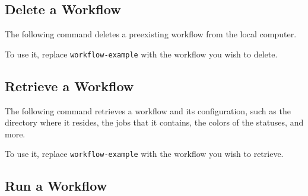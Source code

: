 \hypertarget{delete-a-workflow}{%
\subsection{Delete a Workflow}\label{delete-a-workflow}}

The following command deletes a preexisting workflow from the local
computer.

To use it, replace \texttt{workflow-example} with the workflow you wish
to delete.

\begin{Shaded}
\begin{Highlighting}[]
   \DataTypeTok{\textbackslash{}}
     \DataTypeTok{\textbackslash{}}
     
\end{Highlighting}
\end{Shaded}

\hypertarget{retrieve-a-workflow}{%
\subsection{Retrieve a Workflow}\label{retrieve-a-workflow}}

The following command retrieves a workflow and its configuration, such
as the directory where it resides, the jobs that it contains, the colors
of the statuses, and more.

To use it, replace \texttt{workflow-example} with the workflow you wish
to retrieve.

\begin{Shaded}
\begin{Highlighting}[]
   \DataTypeTok{\textbackslash{}}
     \DataTypeTok{\textbackslash{}}
     
\end{Highlighting}
\end{Shaded}

\hypertarget{run-a-workflow}{%
\subsection{Run a Workflow}\label{run-a-workflow}}

